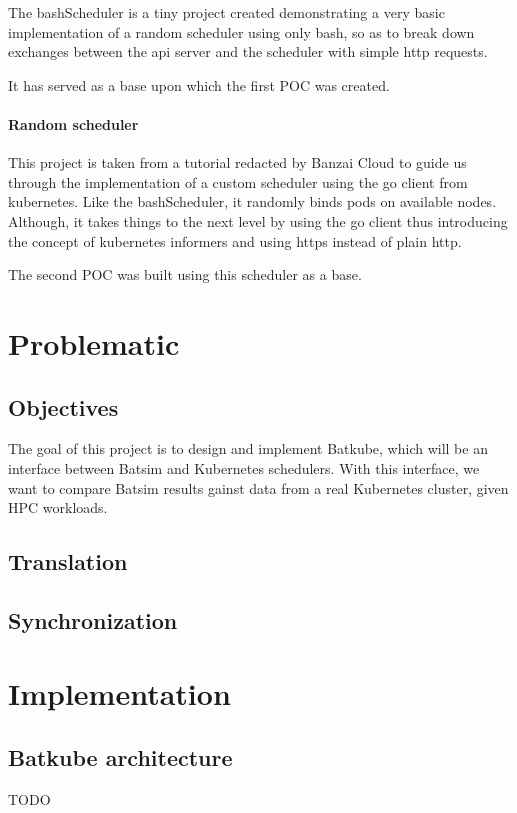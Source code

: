 \documentclass[12pt]{report}
\begin{document}
The bashScheduler\cite{bashScheduler} is a tiny project created demonstrating a
very basic implementation of a random scheduler using only bash, so as to break
down exchanges between the api server and the scheduler with simple http
requests.

It has served as a base upon which the first POC was created.

\subsubsection{Random scheduler}

This project is taken from a tutorial\cite{banzai-tuto} redacted by Banzai
Cloud to guide us through the implementation of a custom scheduler using the go
client\cite{client-go} from kubernetes.
Like the bashScheduler, it randomly binds pods on available nodes. Although, it
takes things to the next level by using the go client thus introducing the
concept of kubernetes informers and using https instead of plain http.

The second POC was built using this scheduler as a base.

\chapter{Problematic}

\section{Objectives}

The goal of this project is to design and implement Batkube, which will be an
interface between Batsim and Kubernetes schedulers. With this interface, we
want to compare Batsim results gainst data from a real Kubernetes cluster,
given HPC workloads.

\section{Translation}

\section{Synchronization}

\chapter{Implementation}

\section{Batkube architecture}
TODO
\end{document}

